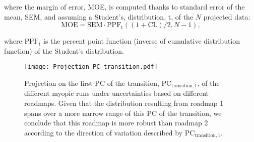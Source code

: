\noindent
where the margin of error, MOE,  is computed thanks to standard error of the mean, SEM, and assuming a Student's, distribution, t,  of the $N$ projected data:
$$
\text{MOE} = \mathrm{SEM}\cdot \mathrm{PPF}_{\mathrm{t}}\left((1+\mathrm{CL})/2,N-1\right),
$$

\noindent
where $\mathrm{PPF}_{\mathrm{t}}$ is the percent point function (\ie inverse of cumulative distribution function) of the Student's distribution.

\begin{figure}[!htbp]
\centering
\texttt{[image: Projection\_PC\_transition.pdf]}
\caption{Projection on the first PC of the transition, $\text{PC}_{\text{transition},1}$, of the different myopic runs under uncertainties based on different roadmaps. Given that the distribution resulting from roadmap 1 spans over a more narrow range of this PC of the transition, we conclude that this roadmap is more robust than roadmap 2 according to the direction of variation described by $\text{PC}_{\text{transition},1}$.}
\label{fig:Projection_PC_transition}
\end{figure}

